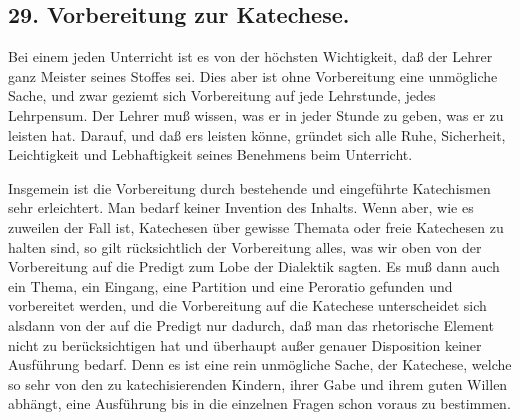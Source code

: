 \subsection*{29. Vorbereitung zur Katechese.}

Bei einem jeden Unterricht ist es von der höchsten Wichtigkeit, daß der Lehrer ganz Meister seines Stoffes sei. Dies aber ist ohne Vorbereitung eine unmögliche Sache, und zwar geziemt sich Vorbereitung auf jede Lehrstunde, jedes Lehrpensum. Der Lehrer muß wissen, was er in jeder Stunde zu geben, was er zu leisten hat. Darauf, und daß ers leisten könne, gründet sich alle Ruhe, Sicherheit, Leichtigkeit und Lebhaftigkeit seines Benehmens beim Unterricht.

Insgemein ist die Vorbereitung durch bestehende und eingeführte Katechismen sehr erleichtert. Man bedarf keiner Invention des Inhalts. Wenn aber, wie es zuweilen der Fall ist, Katechesen über gewisse Themata oder freie Katechesen zu halten sind, so gilt rücksichtlich der Vorbereitung alles, was wir oben von der Vorbereitung auf die Predigt zum Lobe der Dialektik sagten. Es muß dann auch ein Thema, ein Eingang, eine Partition und eine Peroratio gefunden und vorbereitet werden, und die Vorbereitung auf die Katechese unterscheidet sich alsdann von der auf die Predigt nur dadurch, daß man das rhetorische Element nicht zu berücksichtigen hat und überhaupt außer genauer Disposition keiner Ausführung bedarf. Denn es ist eine rein unmögliche Sache, der Katechese, welche so sehr von den zu katechisierenden Kindern, ihrer Gabe und ihrem guten Willen abhängt, eine Ausführung bis in die einzelnen Fragen schon voraus zu bestimmen.

